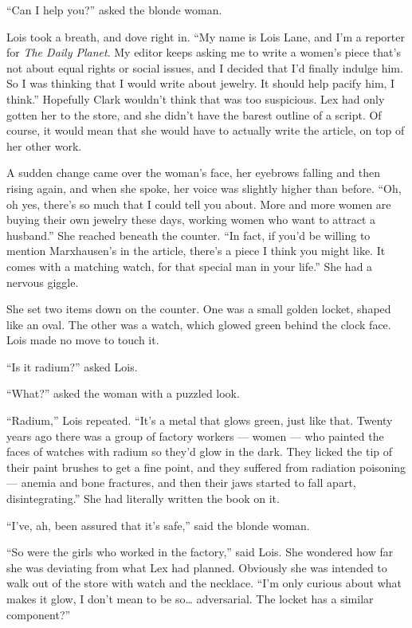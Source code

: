 ``Can I help you?'' asked the blonde woman.

Lois took a breath, and dove right in. ``My name is Lois Lane, and I'm a
reporter for \emph{The Daily Planet}. My editor keeps asking me to write
a women's piece that's not about equal rights or social issues, and I
decided that I'd finally indulge him. So I was thinking that I would
write about jewelry. It should help pacify him, I think.'' Hopefully
Clark wouldn't think that was too suspicious. Lex had only gotten her to
the store, and she didn't have the barest outline of a script. Of
course, it would mean that she would have to actually write the article,
on top of her other work.

A sudden change came over the woman's face, her eyebrows falling and
then rising again, and when she spoke, her voice was slightly higher
than before. ``Oh, oh yes, there's so much that I could tell you about.
More and more women are buying their own jewelry these days, working
women who want to attract a husband.'' She reached beneath the counter.
``In fact, if you'd be willing to mention Marxhausen's in the article,
there's a piece I think you might like. It comes with a matching watch,
for that special man in your life.'' She had a nervous giggle.

She set two items down on the counter. One was a small golden locket,
shaped like an oval. The other was a watch, which glowed green behind
the clock face. Lois made no move to touch it.

``Is it radium?'' asked Lois.

``What?'' asked the woman with a puzzled look.

``Radium,'' Lois repeated. ``It's a metal that glows green, just like
that. Twenty years ago there was a group of factory workers --- women
--- who painted the faces of watches with radium so they'd glow in the
dark. They licked the tip of their paint brushes to get a fine point,
and they suffered from radiation poisoning --- anemia and bone
fractures, and then their jaws started to fall apart, disintegrating.''
She had literally written the book on it.

``I've, ah, been assured that it's safe,'' said the blonde woman.

``So were the girls who worked in the factory,'' said Lois. She wondered
how far she was deviating from what Lex had planned. Obviously she was
intended to walk out of the store with watch and the necklace. ``I'm
only curious about what makes it glow, I don't mean to be so\ldots{}
adversarial. The locket has a similar component?''


